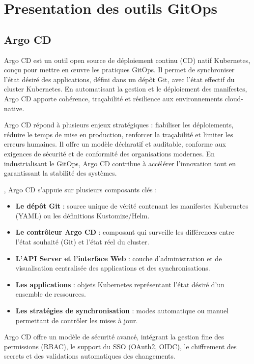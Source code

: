 \section{Presentation des outils GitOps}
\subsection{Argo CD}

Argo CD est un outil open source de déploiement continu (CD) natif Kubernetes, conçu pour mettre en œuvre les pratiques GitOps. Il permet de synchroniser l’état désiré des applications, défini dans un dépôt Git, avec l’état effectif du cluster Kubernetes. En automatisant la gestion et le déploiement des manifestes, Argo CD apporte cohérence, traçabilité et résilience aux environnements cloud-native.

 Argo CD répond à plusieurs enjeux stratégiques  : fiabiliser les déploiements, réduire le temps de mise en production, renforcer la traçabilité et limiter les erreurs humaines. Il offre un modèle déclaratif et auditable, conforme aux exigences de sécurité et de conformité des organisations modernes. En industrialisant le GitOps, Argo CD contribue à accélérer l’innovation tout en garantissant la stabilité des systèmes.

, Argo CD s’appuie sur plusieurs composants clés  :
\begin{itemize}
	\item \textbf{Le dépôt Git}  : source unique de vérité contenant les manifestes Kubernetes (YAML) ou les définitions Kustomize/Helm.
	\item \textbf{Le contrôleur Argo CD}  : composant qui surveille les différences entre l’état souhaité (Git) et l’état réel du cluster.
	\item \textbf{L’API Server et l’interface Web}  : couche d’administration et de visualisation centralisée des applications et des synchronisations.
	\item \textbf{Les applications}  : objets Kubernetes représentant l’état désiré d’un ensemble de ressources.
	\item \textbf{Les stratégies de synchronisation}  : modes automatique ou manuel permettant de contrôler les mises à jour.
\end{itemize}

Argo CD offre un modèle de sécurité avancé, intégrant la gestion fine des permissions (RBAC), le support du SSO (OAuth2, OIDC), le chiffrement des secrets et des validations automatiques des changements.

